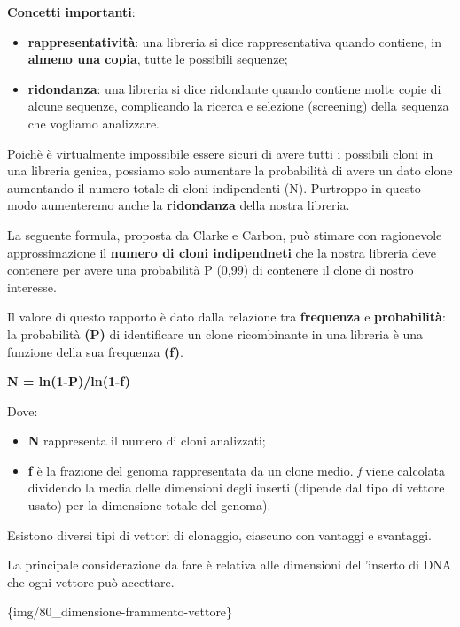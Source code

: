 \documentclass[11pt]{book}
\begin{document}
\textbf{Concetti importanti}:

\begin{itemize}
\itemsep1pt\parskip0pt
\item
  \textbf{rappresentatività}: una libreria si dice rappresentativa
  quando contiene, in \textbf{almeno una copia}, tutte le possibili
  sequenze;
\item
  \textbf{ridondanza}: una libreria si dice ridondante quando contiene
  molte copie di alcune sequenze, complicando la ricerca e selezione
  (screening) della sequenza che vogliamo analizzare.
\end{itemize}

Poichè è virtualmente impossibile essere sicuri di avere tutti i
possibili cloni in una libreria genica, possiamo solo aumentare la
probabilità di avere un dato clone aumentando il numero totale di cloni
indipendenti (N). Purtroppo in questo modo aumenteremo anche la
\textbf{ridondanza} della nostra libreria.

La seguente formula, proposta da Clarke e Carbon, può stimare con
ragionevole approssimazione il \textbf{numero di cloni indipendneti} che
la nostra libreria deve contenere per avere una probabilità P (0,99) di
contenere il clone di nostro interesse.

Il valore di questo rapporto è dato dalla relazione tra
\textbf{frequenza} e \textbf{probabilità}: la probabilità \textbf{(P)}
di identificare un clone ricombinante in una libreria è una funzione
della sua frequenza \textbf{(f)}.

\textbf{N = ln(1-P)/ln(1-f)}

Dove:

\begin{itemize}
\itemsep1pt\parskip0pt
\item
  \textbf{N} rappresenta il numero di cloni analizzati;
\item
  \textbf{f} è la frazione del genoma rappresentata da un clone medio.
  \emph{f} viene calcolata dividendo la media delle dimensioni degli
  inserti (dipende dal tipo di vettore usato) per la dimensione totale
  del genoma).
\end{itemize}

Esistono diversi tipi di vettori di clonaggio, ciascuno con vantaggi e
svantaggi.

La principale considerazione da fare è relativa alle dimensioni
dell'inserto di DNA che ogni vettore può accettare.

\{img/80\_dimensione-frammento-vettore\}
\end{document}
